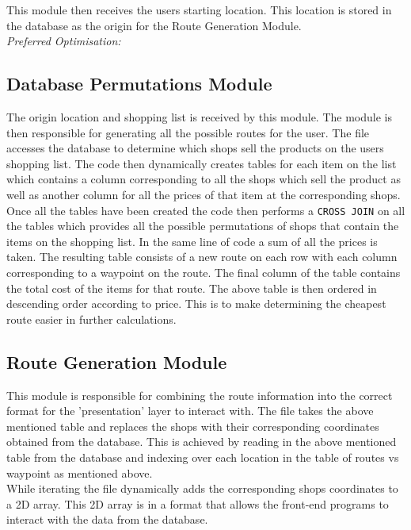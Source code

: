 \documentclass[10pt, a4paper, twocolumn]{scrartcl}
\begin{document}
			This module then receives the users starting location. This location is stored in the database as the origin for the Route Generation Module.\\
			
			\textit{Preferred Optimisation:}
			
			
		\subsection{Database Permutations Module}
			
			The origin location and shopping list is received by this module. The module is then responsible for generating all the possible routes for the user. The file accesses the database to determine which shops sell the products on the users shopping list. The code then dynamically creates tables for each item on the list which contains a column corresponding to all the shops which sell the product as well as another column for all the prices of that item at the corresponding shops. \\
						
			Once all the tables have been created the code then performs a \texttt{CROSS JOIN} on all the tables which provides all the possible permutations of shops that contain the items on the shopping list. In the same line of code a sum of all the prices is taken. The resulting table consists of a new route on each row with each column corresponding to a waypoint on the route. The final column of the table contains the total cost of the items for that route. The above table is then ordered in descending order according to price. This is to make determining the cheapest route easier in further calculations.\\
			
		\subsection{Route Generation Module}
				
			This module is responsible for combining the route information into the correct format for the 'presentation' layer to interact with. The file takes the above mentioned table and replaces the shops with their corresponding coordinates obtained from the database. This is achieved by reading in the above mentioned table from the database and indexing over each location in the table of routes vs waypoint as mentioned above. \\
					
			While iterating the file dynamically adds the corresponding shops coordinates to a 2D array. This 2D array is in a format that allows the front-end programs to interact with the data from the database.\\
			
\end{document}
